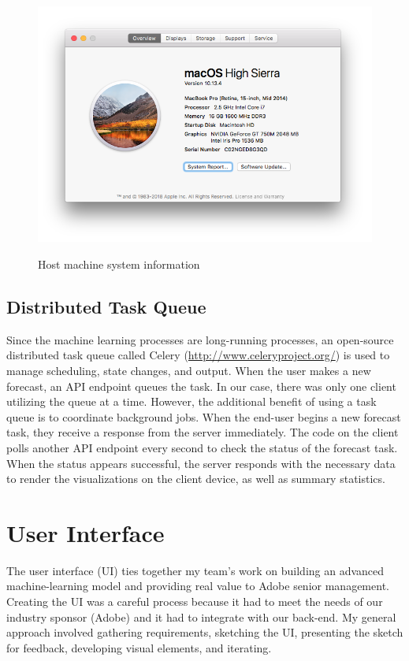 \documentclass[11pt, oneside, authoryear]{report}
\begin{document}
\begin{figure}[h]
  \caption{Host machine system information}
  \centering
  \includegraphics[width=12.5cm]{images/System_Specs.png}
  \label{fig:System_Specs}
\end{figure}

\subsection{Distributed Task Queue}
Since the machine learning processes are long-running processes, an open-source distributed task queue called Celery (\url{http://www.celeryproject.org/}) is used to manage scheduling, state changes, and output. When the user makes a new forecast, an API endpoint queues the task. In our case, there was only one client utilizing the queue at a time. However, the additional benefit of using a task queue is to coordinate background jobs. When the end-user begins a new forecast task, they receive a response from the server immediately. The code on the client polls another API endpoint every second to check the status of the forecast task. When the status appears successful, the server responds with the necessary data to render the visualizations on the client device, as well as summary statistics.

\section{User Interface}
\label{user_interface}
The user interface (UI) ties together my team's work on building an advanced machine-learning model and providing real value to Adobe senior management. Creating the UI was a careful process because it had to meet the needs of our industry sponsor (Adobe) and it had to integrate with our back-end. My general approach involved gathering requirements, sketching the UI, presenting the sketch for feedback, developing visual elements, and iterating.
\end{document}
